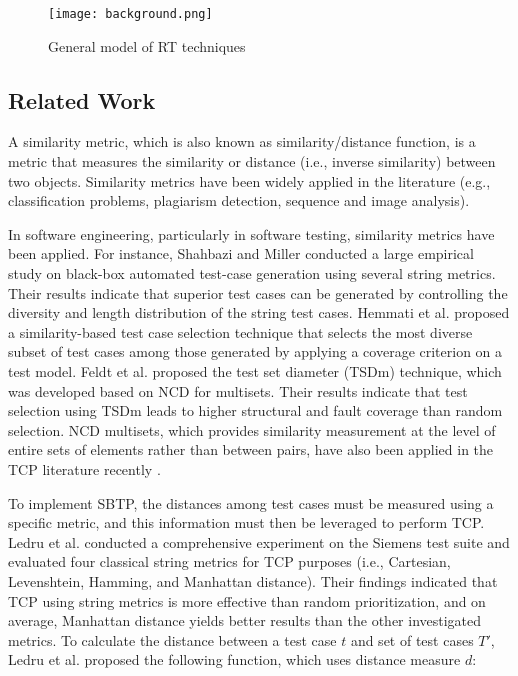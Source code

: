 \documentclass[runningheads]{llncs}
\begin{document}
\begin{figure}[h]
\centering
\texttt{[image: background.png]}
\caption{General model of RT techniques} \label{fig:RT_Background}
\end{figure}


\subsection{Related Work}

A similarity metric, which is also known as similarity/distance function, is a metric that measures the similarity or distance (i.e., inverse similarity) between two objects. Similarity metrics have been widely applied in the literature (e.g., classification problems, plagiarism detection, sequence and image analysis). 

In software engineering, particularly in software testing, similarity metrics have been applied. For instance, Shahbazi and Miller \cite{shahbazi2016black} conducted a large empirical study on black-box automated test-case generation using several string metrics. Their results indicate that superior test cases can be generated by controlling the diversity and length distribution of the string test cases. Hemmati et al. \cite{hemmati2013achieving} proposed a similarity-based test case selection technique that selects the most diverse subset of test cases among those generated by applying a coverage criterion on a test model. Feldt et al. \cite{feldt2016test} proposed the test set diameter (TSDm) technique, which was developed based on NCD for multisets. Their results indicate that test selection using TSDm leads to higher structural and fault coverage than random selection. NCD multisets, which provides similarity measurement at the level of entire sets of elements rather than between pairs, have also been applied in the TCP literature recently \cite{henard2016comparing}.

To implement SBTP, the distances among test cases must be measured using a specific metric, and this information must then be leveraged to perform TCP. Ledru et al. \cite{ledru2012prioritizing} conducted a comprehensive experiment on the Siemens test suite and evaluated four classical string metrics for TCP purposes (i.e., Cartesian, Levenshtein, Hamming, and Manhattan distance). Their findings indicated that TCP using string metrics is more effective than random prioritization, and on average, Manhattan distance yields better results than the other investigated metrics. To calculate the distance between a test case $t$ and set of test cases $T'$, Ledru et al. proposed the following function, which uses distance measure $d$: 
\end{document}
